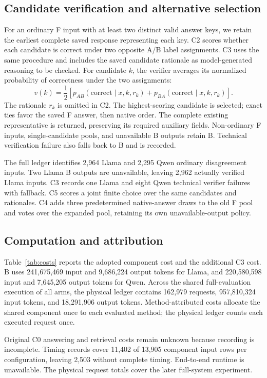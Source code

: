 \subsection{Candidate verification and alternative selection}
For an ordinary F input with at least two distinct valid answer keys, we retain the earliest complete saved response representing each key. C2 scores whether each candidate is correct under two opposite A/B label assignments. C3 uses the same procedure and includes the saved candidate rationale as model-generated reasoning to be checked. For candidate $k$, the verifier averages its normalized probability of correctness under the two assignments:
\begin{equation}
 v(k)=\frac{1}{2}\left[p_{AB}(\mathrm{correct}\mid x,k,r_k)+p_{BA}(\mathrm{correct}\mid x,k,r_k)\right].
\end{equation}
The rationale $r_k$ is omitted in C2. The highest-scoring candidate is selected; exact ties favor the saved F answer, then native order. The complete existing representative is returned, preserving its required auxiliary fields. Non-ordinary F inputs, single-candidate pools, and unavailable B outputs retain B. Technical verification failure also falls back to B and is recorded.

The full ledger identifies 2,964 Llama and 2,295 Qwen ordinary disagreement inputs. Two Llama B outputs are unavailable, leaving 2,962 actually verified Llama inputs. C3 records one Llama and eight Qwen technical verifier failures with fallback. C5 scores a joint finite choice over the same candidates and rationales. C4 adds three predetermined native-answer draws to the old F pool and votes over the expanded pool, retaining its own unavailable-output policy.

\subsection{Computation and attribution}
\label{app:cost}
Table~\ref{tab:costs} reports the adopted component cost and the additional C3 cost. B uses 241,675,469 input and 9,686,224 output tokens for Llama, and 220,580,598 input and 7,645,205 output tokens for Qwen. Across the shared full-evaluation execution of all arms, the physical ledger contains 162,979 requests, 957,810,324 input tokens, and 18,291,906 output tokens. Method-attributed costs allocate the shared component once to each evaluated method; the physical ledger counts each executed request once.



Original C0 answering and retrieval costs remain unknown because recording is incomplete. Timing records cover 11,402 of 13,905 component input rows per configuration, leaving 2,503 without complete timing. End-to-end runtime is unavailable. The physical request totals cover the later full-system experiment.
\FloatBarrier
